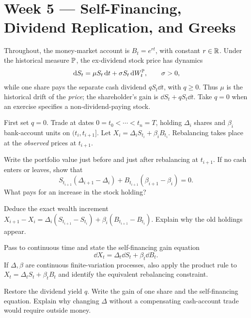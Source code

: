 \section{Week 5 --- Self-Financing, Dividend Replication, and Greeks}

Throughout, the money-market account is \(B_t=e^{rt}\), with constant
\(r\in\mathbb{R}\). Under the historical measure \(\mathbb P\), the ex-dividend stock
price has dynamics
\[
\,\mathrm d S_t=\mu S_t\,\mathrm d t+\sigma S_t\,\mathrm d W_t^{\mathbb P},
\qquad \sigma>0,
\]
while one share pays the separate cash dividend \(qS_t\dd t\), with
\(q\geq0\). Thus \(\mu\) is the historical drift of the \emph{price}; the
shareholder's gain is \(\dd S_t+qS_t\dd t\). Take \(q=0\) when an exercise
specifies a non-dividend-paying stock.

\ifIncludeCore

\setcounter{exercise}{0}
\begin{exercise}
First set \(q=0\). Trade at dates \(0=t_0<\cdots<t_n=T\), holding
\(\Delta_i\) shares and \(\beta_i\) bank-account units on
\((t_i,t_{i+1}]\). Let \(X_i=\Delta_iS_{t_i}+\beta_iB_{t_i}\).
Rebalancing takes place at the \emph{observed} prices at \(t_{i+1}\).
\begin{exparts}
  \item Write the portfolio value just before and just after rebalancing at
  \(t_{i+1}\). If no cash enters or leaves, show that
  \[
  S_{t_{i+1}}(\Delta_{i+1}-\Delta_i)
  +B_{t_{i+1}}(\beta_{i+1}-\beta_i)=0.
  \]
  What pays for an increase in the stock holding?
  \item Deduce the exact wealth increment
  \(X_{i+1}-X_i=\Delta_i(S_{t_{i+1}}-S_{t_i})
  +\beta_i(B_{t_{i+1}}-B_{t_i})\). Explain why the old holdings appear.
  \item Pass to continuous time and state the self-financing gain equation
  \[
  \dd X_t=\Delta_t\dd S_t+\beta_t\dd B_t.
  \]
  If \(\Delta,\beta\) are continuous finite-variation processes, also
  apply the product rule to \(X_t=\Delta_tS_t+\beta_tB_t\) and identify
  the equivalent rebalancing constraint.
  \item Restore the dividend yield \(q\). Write the gain of one share and
  the self-financing equation. Explain why changing \(\Delta\) without a
  compensating cash-account trade would require outside money.
\end{exparts}
\end{exercise}

